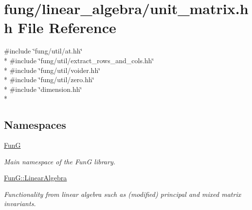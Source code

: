\hypertarget{unit__matrix_8hh}{\section{fung/linear\-\_\-algebra/unit\-\_\-matrix.hh File Reference}
\label{unit__matrix_8hh}
}
{\ttfamily \#include \char`\"{}fung/util/at.\-hh\char`\"{}}\\*
{\ttfamily \#include \char`\"{}fung/util/extract\-\_\-rows\-\_\-and\-\_\-cols.\-hh\char`\"{}}\\*
{\ttfamily \#include \char`\"{}fung/util/voider.\-hh\char`\"{}}\\*
{\ttfamily \#include \char`\"{}fung/util/zero.\-hh\char`\"{}}\\*
{\ttfamily \#include \char`\"{}dimension.\-hh\char`\"{}}\\*
\subsection*{Namespaces}
\begin{DoxyCompactItemize}
\item 
\hyperlink{namespaceFunG}{Fun\-G}
\begin{DoxyCompactList}\small\item\em Main namespace of the Fun\-G library. \end{DoxyCompactList}\item 
\hyperlink{namespaceFunG_1_1LinearAlgebra}{Fun\-G\-::\-Linear\-Algebra}
\begin{DoxyCompactList}\small\item\em Functionality from linear algebra such as (modified) principal and mixed matrix invariants. \end{DoxyCompactList}\end{DoxyCompactItemize}
